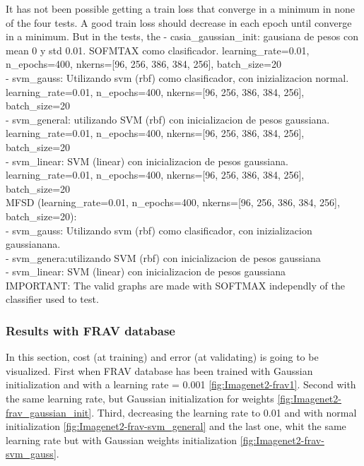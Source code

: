 It has not been possible getting a train loss that converge in a minimum in none of the four tests. A good train loss should decrease in each epoch until converge in a minimum. But in the tests, the
- casia\_gaussian\_init: gausiana de pesos con mean 0 y std 0.01. SOFMTAX como clasificador. learning\_rate=0.01, n\_epochs=400, nkerns=[96, 256, 386, 384, 256], batch\_size=20 \\
- svm\_gauss: Utilizando svm (rbf) como clasificador, con inizializacion normal. learning\_rate=0.01, n\_epochs=400, nkerns=[96, 256, 386, 384, 256], batch\_size=20\\
- svm\_general: utilizando SVM (rbf) con inicializacion de pesos gaussiana. learning\_rate=0.01, n\_epochs=400, nkerns=[96, 256, 386, 384, 256], batch\_size=20\\
- svm\_linear: SVM (linear) con inicializacion de pesos gaussiana. learning\_rate=0.01, n\_epochs=400, nkerns=[96, 256, 386, 384, 256], batch\_size=20\\

MFSD  (learning\_rate=0.01, n\_epochs=400, nkerns=[96, 256, 386, 384, 256], batch\_size=20):\\
- svm\_gauss: Utilizando svm (rbf) como clasificador, con inizializacion gaussianana.\\
- svm\_genera:utilizando SVM (rbf) con inicializacion de pesos gaussiana \\
- svm\_linear: SVM (linear) con inicializacion de pesos gaussiana\\

IMPORTANT: The valid graphs are made with SOFTMAX independly of the classifier used to test.\\

\subsubsection{Results with FRAV database}

In this section, cost (at training) and error (at validating) is going to be visualized. First when FRAV database has been trained with Gaussian initialization and with a learning rate = 0.001 \ref{fig:Imagenet2-frav1}. Second with the same learning rate, but Gaussian initialization for weights \ref{fig:Imagenet2-frav_gaussian_init}. Third, decreasing the learning rate to 0.01 and with normal initialization \ref{fig:Imagenet2-frav-svm_general} and the last one, whit the same learning rate but with Gaussian weights initialization \ref{fig:Imagenet2-frav-svm_gauss}.\\


